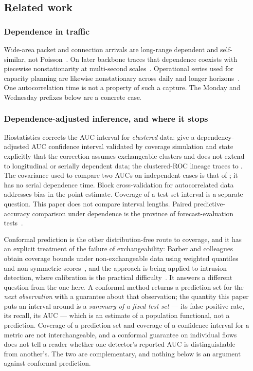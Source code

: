 \documentclass[a4paper,fleqn]{cas-dc}
\begin{document}
\subsection{Related work}\label{sec:related}
\subsubsection{Dependence in traffic}
Wide-area packet and connection arrivals are long-range dependent and self-similar, not
Poisson~\citep{paxson1995failure,leland1994self}. On later backbone traces that dependence coexists
with piecewise nonstationarity at multi-second scales~\citep{karagiannis2004nonstationary}.
Operational series used for capacity planning are likewise nonstationary across daily and longer
horizons~\citep{yang2023nonstat}. One autocorrelation time is not a property of such a capture.
The Monday and Wednesday prefixes below are a concrete case.

\subsubsection{Dependence-adjusted inference, and where it stops}
Biostatistics corrects the AUC interval
for \emph{clustered} data: \citet{bay2023dependency} give a dependency-adjusted AUC
confidence interval validated by coverage simulation and state explicitly that the correction assumes
exchangeable clusters and does not extend to longitudinal or serially dependent data; the
clustered-ROC lineage traces to \citet{obuchowski1997nonparametric}. The covariance used
to compare two AUCs on independent cases is that of \citet{delong1988comparing}; it has no serial
dependence time. Block cross-validation for autocorrelated
data~\citep{roberts2017cross,bergmeir2012use} addresses bias in the point estimate. Coverage of a
test-set interval is a separate question. This paper does not compare interval lengths. Paired
predictive-accuracy comparison under dependence is the province of forecast-evaluation
tests~\citep{diebold1995comparing,giacomini2006tests,hansen2011mcs}.

Conformal prediction is the other distribution-free route to coverage, and it has an
explicit treatment of the failure of exchangeability: Barber and colleagues obtain coverage
bounds under non-exchangeable data using weighted quantiles and non-symmetric
scores~\citep{barber2023beyond}, and the approach is being applied to intrusion detection, where
calibration is the practical difficulty~\citep{li2026conformalids}. It answers a different
question from the one here. A conformal method returns a prediction set for the \emph{next
observation} with a guarantee about that observation; the quantity this paper puts an interval
around is a \emph{summary of a fixed test set} --- its false-positive rate, its recall, its AUC ---
which is an estimate of a population functional, not a prediction. Coverage of a prediction set and
coverage of a confidence interval for a metric are not interchangeable, and a conformal guarantee
on individual flows does not tell a reader whether one detector's reported AUC is distinguishable
from another's. The two are complementary, and nothing below is an argument against conformal
prediction.
\end{document}
